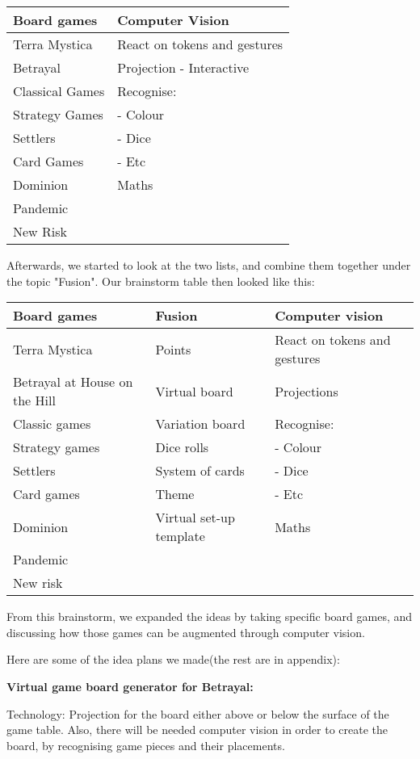 \begin{tabular}{l | l}
Board games & Computer Vision\\
\hline
Terra Mystica & React on tokens and gestures\\
Betrayal & Projection - Interactive\\
Classical Games & Recognise:\\
Strategy Games & - Colour\\
Settlers & - Dice\\
Card Games & - Etc\\
Dominion & Maths\\
Pandemic & \\
New Risk & \\
\end{tabular}

Afterwards, we started to look at the two lists, and combine them together under the topic "Fusion". Our brainstorm table then looked like this:

\begin{tabular}{l | l | l}
Board games & Fusion & Computer vision\\
\hline
Terra Mystica & Points & React on tokens and gestures\\
Betrayal at House on the Hill &  Virtual board & Projections\\
Classic games & Variation board & Recognise: \\
Strategy games & Dice rolls & - Colour\\
Settlers & System of cards & - Dice\\
Card games & Theme & - Etc\\
Dominion & Virtual set-up template & Maths\\
Pandemic \\
New risk\\
\end{tabular}

From this brainstorm, we expanded the ideas by taking specific board games, and discussing how those games can be augmented through computer vision.


Here are some of the idea plans we made(the rest are in appendix):

\textbf{Virtual game board generator for Betrayal:} 

Technology: Projection for the board either above or below the surface of the game table. Also, there will be needed computer vision in order to create the board, by recognising game pieces and their placements.

